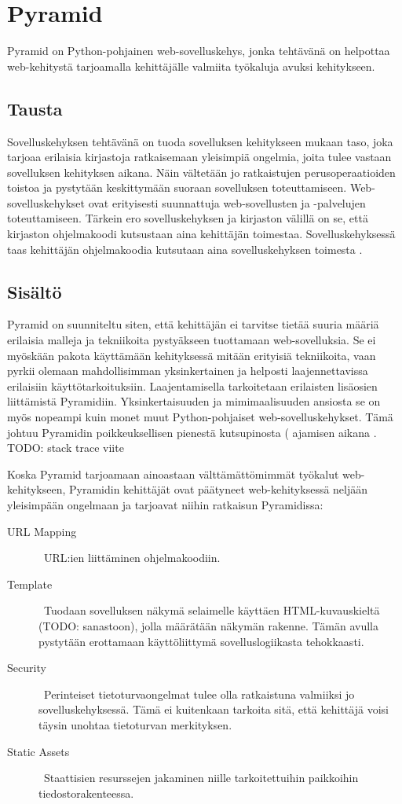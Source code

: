 \documentclass[finnish,utf8,nonumbib,palatino,kandi]{gradu2}
\begin{document}
\section{Pyramid}
Pyramid on Python-pohjainen web-sovelluskehys, jonka tehtävänä on helpottaa web-kehitystä tarjoamalla
kehittäjälle valmiita työkaluja avuksi kehitykseen. 

\subsection{Tausta}
Sovelluskehyksen tehtävänä on tuoda sovelluksen kehitykseen mukaan
taso, joka tarjoaa erilaisia kirjastoja ratkaisemaan yleisimpiä ongelmia, joita tulee vastaan sovelluksen kehityksen aikana. Näin vältetään
jo ratkaistujen perusoperaatioiden toistoa ja pystytään keskittymään suoraan sovelluksen toteuttamiseen. Web-sovelluskehykset ovat erityisesti suunnattuja
web-sovellusten ja -palvelujen toteuttamiseen\cite{Frameworks}.  Tärkein ero sovelluskehyksen ja kirjaston välillä on se, että kirjaston ohjelmakoodi kutsustaan aina
kehittäjän toimestaa. Sovelluskehyksessä taas kehittäjän ohjelmakoodia kutsutaan aina sovelluskehyksen toimesta \cite{Pyramid:intr}.

\subsection{Sisältö}
Pyramid on suunniteltu siten, että kehittäjän ei tarvitse tietää suuria määriä erilaisia malleja ja tekniikoita pystyäkseen tuottamaan web-sovelluksia. Se ei myöskään pakota käyttämään kehityksessä
mitään erityisiä tekniikoita, vaan pyrkii olemaan mahdollisimman yksinkertainen ja helposti laajennettavissa erilaisiin käyttötarkoituksiin. Laajentamisella tarkoitetaan erilaisten lisäosien
liittämistä Pyramidiin. Yksinkertaisuuden ja mimimaalisuuden ansiosta se on myös nopeampi kuin monet muut Python-pohjaiset web-sovelluskehykset. Tämä johtuu Pyramidin poikkeuksellisen
pienestä kutsupinosta (\cite{Stack Trace} ajamisen aikana \cite{Pyramid:intr}. TODO: stack trace viite

Koska Pyramid tarjoamaan ainoastaan  välttämättömimmät työkalut web-kehitykseen, Pyramidin kehittäjät
ovat päätyneet web-kehityksessä neljään yleisimpään ongelmaan ja tarjoavat niihin ratkaisun Pyramidissa: 

\begin{description}
\item [URL Mapping] \ URL:ien liittäminen ohjelmakoodiin. 
\item[Template] \ Tuodaan sovelluksen näkymä selaimelle käyttäen HTML-kuvauskieltä (TODO: sanastoon), jolla määrätään näkymän rakenne. Tämän avulla pystytään erottamaan käyttöliittymä sovelluslogiikasta tehokkaasti.
\item[Security] \ Perinteiset tietoturvaongelmat tulee olla ratkaistuna valmiiksi jo sovelluskehyksessä. Tämä ei kuitenkaan tarkoita sitä, että kehittäjä voisi täysin unohtaa tietoturvan merkityksen.
\item[Static Assets] \ Staattisien resurssejen jakaminen niille tarkoitettuihin paikkoihin tiedostorakenteessa.
\end{description}
\end{document}
